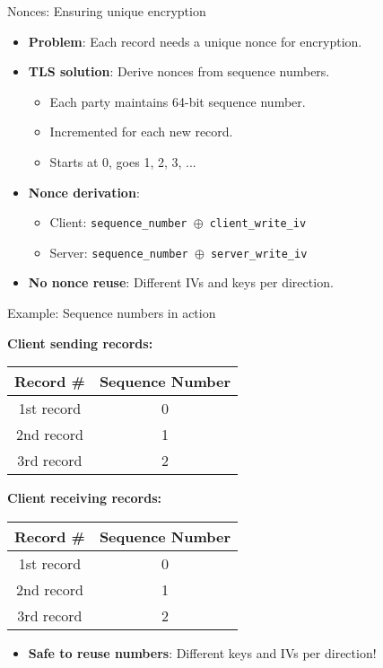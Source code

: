 \documentclass[aspectratio=169, lualatex, handout]{beamer}
\begin{document}
\begin{frame}{Nonces: Ensuring unique encryption}
	\begin{itemize}[<+->]
		\item \textbf{Problem}: Each record needs a unique nonce for encryption.
		\item \textbf{TLS solution}: Derive nonces from sequence numbers.
		      \begin{itemize}
			      \item Each party maintains 64-bit sequence number.
			      \item Incremented for each new record.
			      \item Starts at 0, goes 1, 2, 3, ...
		      \end{itemize}
		\item \textbf{Nonce derivation}:
		      \begin{itemize}
			      \item Client: \texttt{sequence\_number $\oplus$ client\_write\_iv}
			      \item Server: \texttt{sequence\_number $\oplus$ server\_write\_iv}
		      \end{itemize}
		\item \textbf{No nonce reuse}: Different IVs and keys per direction.
	\end{itemize}
\end{frame}

\begin{frame}{Example: Sequence numbers in action}
	\begin{center}
		\textbf{Client sending records:}
		\begin{tabular}{|c|c|}
			\hline
			\textbf{Record \#} & \textbf{Sequence Number} \\
			\hline
			1st record         & 0                        \\
			\hline
			2nd record         & 1                        \\
			\hline
			3rd record         & 2                        \\
			\hline
		\end{tabular}
	\end{center}
	\pause
	\begin{center}
		\textbf{Client receiving records:}
		\begin{tabular}{|c|c|}
			\hline
			\textbf{Record \#} & \textbf{Sequence Number} \\
			\hline
			1st record         & 0                        \\
			\hline
			2nd record         & 1                        \\
			\hline
			3rd record         & 2                        \\
			\hline
		\end{tabular}
	\end{center}
	\pause
	\begin{itemize}
		\item \textbf{Safe to reuse numbers}: Different keys and IVs per direction!
	\end{itemize}
\end{frame}
\end{document}

